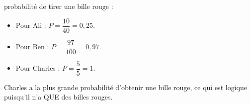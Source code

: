    probabilité de tirer une bille rouge :
   \begin{itemize}
      \item Pour Ali : $P =\dfrac{10}{40} =0,25$. \smallskip
      \item Pour Ben : $P =\dfrac{97}{100} =0,97$. \smallskip
      \item Pour Charles : $P =\dfrac{5}{5} =1$. \smallskip
   \end{itemize}
  {\blue Charles a la plus grande probabilité d'obtenir une bille rouge}, ce qui est logique puisqu'il n'a QUE des billes rouges. \\
